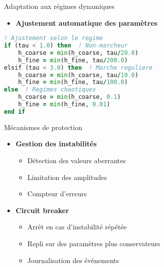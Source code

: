 \begin{frame}[fragile]{Adaptation aux régimes dynamiques}
    \begin{itemize}
        \item \textbf{Ajustement automatique des paramètres}
    \end{itemize}
    \begin{lstlisting}[basicstyle=\ttfamily, language=Fortran]
! Ajustement selon le regime
if (tau < 1.0) then  ! Non-marcheur
    h_coarse = min(h_coarse, tau/20.0)
    h_fine = min(h_fine, tau/200.0)
elsif (tau < 3.0) then  ! Marche reguliere
    h_coarse = min(h_coarse, tau/10.0)
    h_fine = min(h_fine, tau/100.0)
else  ! Regimes chaotiques
    h_coarse = min(h_coarse, 0.1)
    h_fine = min(h_fine, 0.01)
end if
    \end{lstlisting}
\end{frame}

\begin{frame}{Mécanismes de protection}
    \begin{itemize}
        \item \textbf{Gestion des instabilités}
        \begin{itemize}
            \item Détection des valeurs aberrantes
            \item Limitation des amplitudes
            \item Compteur d'erreurs
        \end{itemize}
        \vspace{0.3cm}
        \item \textbf{Circuit breaker}
        \begin{itemize}
            \item Arrêt en cas d'instabilité répétée
            \item Repli sur des paramètres plus conservateurs
            \item Journalisation des événements
        \end{itemize}
    \end{itemize}
\end{frame}

